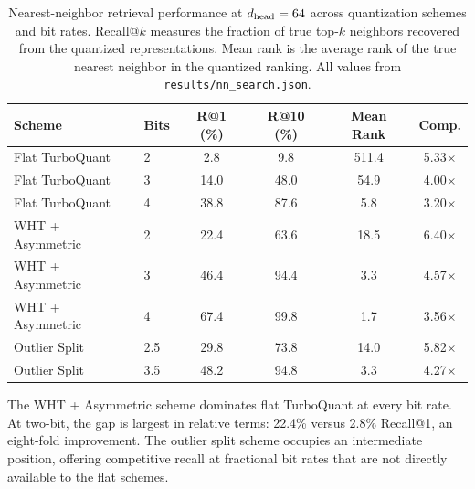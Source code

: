 \begin{table}[ht]
\vspace{-4pt}
\centering
\caption{Nearest-neighbor retrieval performance at $d_{\text{head}} = 64$ across
quantization schemes and bit rates.
Recall@$k$ measures the fraction of true top-$k$ neighbors recovered
from the quantized representations.
Mean rank is the average rank of the true nearest neighbor in the
quantized ranking.
All values from \texttt{results/nn\_search.json}.}
\label{tab:nn}
\footnotesize
\begin{tabular}{@{}llcccc@{}}
\toprule
\textbf{Scheme} & \textbf{Bits} & \textbf{R@1 (\%)} & \textbf{R@10 (\%)}
  & \textbf{Mean Rank} & \textbf{Comp.} \\
\midrule
Flat TurboQuant & 2 &  2.8 &  9.8 & 511.4 & 5.33$\times$ \\
Flat TurboQuant & 3 & 14.0 & 48.0 &  54.9 & 4.00$\times$ \\
Flat TurboQuant & 4 & 38.8 & 87.6 &   5.8 & 3.20$\times$ \\
\midrule
WHT + Asymmetric & 2 & 22.4 & 63.6 &  18.5 & 6.40$\times$ \\
WHT + Asymmetric & 3 & 46.4 & 94.4 &   3.3 & 4.57$\times$ \\
WHT + Asymmetric & 4 & 67.4 & 99.8 &   1.7 & 3.56$\times$ \\
\midrule
Outlier Split & 2.5 & 29.8 & 73.8 &  14.0 & 5.82$\times$ \\
Outlier Split & 3.5 & 48.2 & 94.8 &   3.3 & 4.27$\times$ \\
\bottomrule
\end{tabular}
\vspace{-4pt}
\end{table}

The WHT + Asymmetric scheme dominates flat TurboQuant at every bit rate.
At two-bit, the gap is largest in relative terms: 22.4\% versus 2.8\%
Recall@1, an eight-fold improvement.
The outlier split scheme occupies an intermediate position, offering
competitive recall at fractional bit rates that are not directly
available to the flat schemes.

